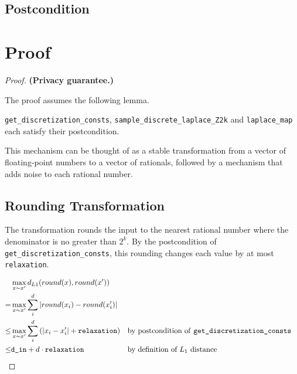 \documentclass{article}
\begin{document}
\subsection*{Postcondition}


\section{Proof}

\begin{proof} 
\textbf{(Privacy guarantee.)} 
    
\begin{tcolorbox}
    The proof assumes the following lemma.
    \begin{lemma}
        \texttt{get\_discretization\_consts}, \texttt{sample\_discrete\_laplace\_Z2k} and \texttt{laplace\_map} each satisfy their postcondition.
    \end{lemma}
\end{tcolorbox}

This mechanism can be thought of as a stable transformation from a vector of floating-point numbers to a vector of rationals,
followed by a mechanism that adds noise to each rational number.

\subsection{Rounding Transformation}

The transformation rounds the input to the nearest rational number where the denominator is no greater than $2^k$.
By the postcondition of \texttt{get\_discretization\_consts}, this rounding changes each value by at most \texttt{relaxation}.

\begin{align*}
    &\max_{x \sim x'} d_{L1}(round(x), round(x')) \\
    =& \max_{x \sim x'} \sum_i^d \left| round(x_i) - round(x'_i) \right| \\
    \leq& \max_{x \sim x'} \sum_i^d \left(\left| x_i - x'_i \right| + \texttt{relaxation} \right) &&\text{by postcondition of \texttt{get\_discretization\_consts}} \\
    \leq& \texttt{d\_in} + d \cdot \texttt{relaxation} &&\text{by definition of } L_1 \text{ distance}
\end{align*}


\end{proof}
\end{document}
